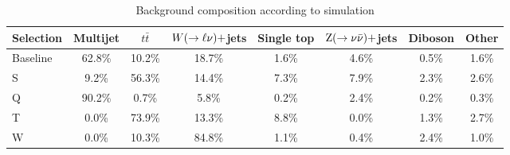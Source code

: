 \begin{table}[htpb]
\centering
\caption{Background composition according to simulation
\label{tab:BG_comp_percent}}
\vspace{1ex}
\begin{tabular}{ l  c  c  c  c  c  c  c }
\hline \hline
Selection & Multijet & $t\bar{t}$ & $W(\rightarrow \ell\nu)+$jets & Single top & $\mathrm{Z}(\rightarrow
\nu\bar{\nu})+$jets & Diboson & Other \\  
\hline \hline
Baseline & 62.8\% & 10.2\% & 18.7\% & 1.6\% & 4.6\% & 0.5\% & 1.6\% \\ 
S & 9.2\% & 56.3\% & 14.4\%  & 7.3\% & 7.9\% & 2.3\% & 2.6\% \\
Q & 90.2\% & 0.7\% & 5.8\%  & 0.2\% & 2.4\% & 0.2\% & 0.3\% \\
T & 0.0\% & 73.9\% & 13.3\%  & 8.8\% & 0.0\% & 1.3\% & 2.7\% \\
W & 0.0\% & 10.3\% & 84.8\%  & 1.1\% & 0.4\% & 2.4\% & 1.0\% \\
\hline
\end{tabular}
\end{table}

